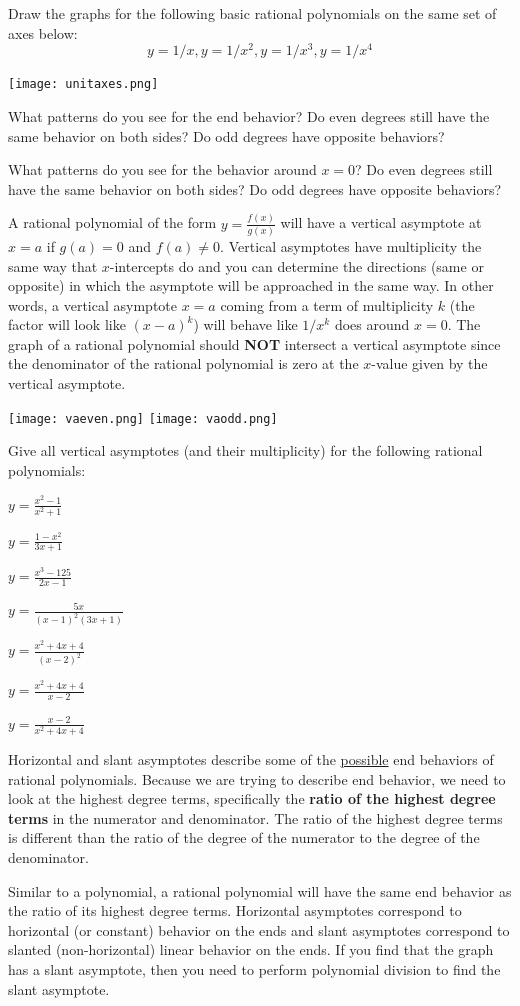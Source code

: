 \bq Draw the graphs for the following basic rational polynomials on the same set of axes below:
$$ y=1/x, y=1/x^2, y=1/x^3, y=1/x^4$$

\texttt{[image: unitaxes.png]}

\be
\item What patterns do you see for the end behavior? Do even degrees still have the same behavior on both sides? Do odd degrees have opposite behaviors?
\item What patterns do you see for the behavior around $x=0$? Do even degrees still have the same behavior on both sides? Do odd degrees have opposite behaviors?
\ee
\eq

\begin{info}
A rational polynomial of the form $y =\frac{f(x)}{g(x)}$ will have a vertical asymptote at $x=a$ if $g(a)=0$ and $f(a) \neq 0$. Vertical asymptotes have multiplicity the same way that $x$-intercepts do and you can determine the directions (same or opposite) in which the asymptote will be approached in the same way. In other words, a vertical asymptote $x=a$ coming from a term of multiplicity $k$ (the factor will look like $(x-a)^k$) will behave like $1/x^k$ does around $x=0$. The graph of a rational polynomial should \textbf{NOT} intersect a vertical asymptote since the denominator of the rational polynomial is zero at the $x$-value given by the vertical asymptote.

\begin{center} \texttt{[image: vaeven.png]} \texttt{[image: vaodd.png]} \end{center}
\end{info}
\bq Give all vertical asymptotes (and their multiplicity) for the following rational polynomials:
\be
\item $y=\frac{x^2-1}{x^2+1}$
\item $y=\frac{1-x^2}{3x+1}$
\item $y=\frac{x^3-125}{2x-1}$
\item $y=\frac{5x}{(x-1)^2(3x+1)}$
\item $y=\frac{x^2+4x+4}{(x-2)^2}$
\item $y=\frac{x^2+4x+4}{x-2}$
\item $y=\frac{x-2}{x^2+4x+4}$
\ee
\eq

\begin{info}
Horizontal and slant asymptotes describe some of the \underline{possible} end behaviors of rational polynomials. Because we are trying to describe end behavior, we need to look at the highest degree terms, specifically the \textbf{ratio of the highest degree terms} in the numerator and denominator. The ratio of the highest degree terms is different than the ratio of the degree of the numerator to the degree of the denominator.

Similar to a polynomial, a rational polynomial will have the same end behavior as the ratio of its highest degree terms. Horizontal asymptotes correspond to horizontal (or constant) behavior on the ends and slant asymptotes correspond to slanted (non-horizontal) linear behavior on the ends. If you find that the graph has a slant asymptote, then you need to perform polynomial division to find the slant asymptote.
\end{info}

